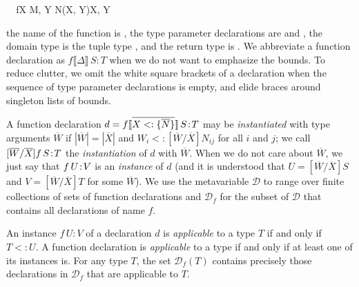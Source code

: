\documentclass[10pt]{sigplanconf}
\newcommand{\TODO}[1]{\textbf{\emph{\textcolor{red}{TODO}}}: \textsf{\footnotesize #1}}
\renewcommand{\bar}{\overline}
\newcommand{\extends}{\ensuremath{<:}}
\newcommand{\subtypeof}{\ensuremath{<:}}
\newcommand{\ob}[1]{\ensuremath{\llbracket {#1} \rrbracket}}
\newcommand{\bd}[1]{\ensuremath{\{\bar{#1}\}}}
\newcommand{\substb}[2]{\ensuremath{[\bar{#1}/\bar{#2}]}}
\newcommand{\bds}[2]{\ensuremath{\bar{{#1} \extends \bd{#2}}}}
\newcommand{\tplist}[2]{\ensuremath{\ob{\bds{#1}{#2}}}}
\newcommand{\decl}[3]{\mbox{\ensuremath{{#1}\,{#2}\!:\!{#3}}}}
\newcommand{\declg}[5]{\mbox{\ensuremath{#1 \tplist{#2}{#3}\, #4\!:\!#5}}}
\newcommand{\hdeclg}[4]{\mbox{\ensuremath{#1 \ob{#2}\, #3\!:\!#4}}}
\newcommand{\D}{\ensuremath{\mathcal{D}}}
\newcommand{\Df}[1][f]{\D_{\!#1}}
\newcommand{\eqred}{\overset{\equiv}{\longrightarrow}}
\newcommand{\jtred}[2]{\ensuremath{\Delta \vdash\,{#1} \eqred {#2}}}
\begin{document}
\begin{FortressCode}
{\tt ~~}\+f\llbracket{}X \SHORTCUT{<} M, Y \SHORTCUT{<} N\rrbracket\bigl(\llbracket{}X\rrbracket, \llbracket{}Y\rrbracket\bigr)\COLON {}\llbracket{}X, Y\rrbracket\-
\end{FortressCode}
the name of the function is , 
the type parameter declarations are  and , 
the domain type is the tuple type , 
and the return type is .
We abbreviate a function declaration as \hdeclg{f}{\Delta}{S}{T} 
when we do not want to emphasize the bounds.
To reduce clutter,
we omit the white square brackets of a declaration 
when the sequence of type parameter declarations is empty, 
and elide braces around singleton lists of bounds.

A function declaration $d = \declg{f}{X}{N}{S}{T}$
may be \emph{instantiated} with type arguments $\bar{W}$ 
if $|\bar{W}| = |\bar{X}|$ 
and $W_i \subtypeof \substb{W}{X} N_{ij}$ for all $i$ and $j$;
we call $\substb{W}{X} \decl{f}{S}{T}$
the \emph{instantiation} of $d$ with $\bar{W}$. 
When we do not care about $\bar{W}$, 
we just say that $\decl{f}{U}{V}$
is an \emph{instance} of $d$ 
(and it is understood that $U=\substb{W}{X}S$
and $V=\substb{W}{X}T$ for some $\bar{W}$).
%
We use the metavariable $\D$ 
to range over finite collections of sets of function declarations 
and $\Df$ for the subset of $\D$ 
that contains all declarations of name $f$.

An instance \decl{f}{U}{V} of a declaration $d$ 
is \emph{applicable} to a type $T$ 
if and only if $T \subtypeof U$.
A function declaration is \emph{applicable} to a type 
if and only if at least one of its instances is.
%
For any type $T$, the set $\Df(T)$ contains precisely those declarations
in $\Df$ that are applicable to $T$.
%


    
  
\end{document}
